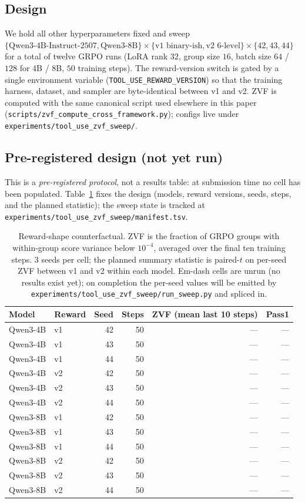 \documentclass{article}
\begin{document}
\subsection{Design}
We hold all other hyperparameters fixed and sweep
\(\{\text{Qwen3-4B-Instruct-2507}, \text{Qwen3-8B}\}
 \times \{\text{v1 binary-ish}, \text{v2 6-level}\}
 \times \{42, 43, 44\}\)
for a total of twelve GRPO runs
(LoRA rank \(32\), group size \(16\), batch size
\(64\) / \(128\) for 4B / 8B, \(50\) training steps).
The reward-version switch is gated by a single environment variable
(\texttt{TOOL\_USE\_REWARD\_VERSION}) so that the training harness, dataset,
and sampler are byte-identical between v1 and v2. ZVF is computed with the
same canonical script used elsewhere in this paper
(\texttt{scripts/zvf\_compute\_cross\_framework.py}); configs live under
\texttt{experiments/tool\_use\_zvf\_sweep/}.

\subsection{Pre-registered design (not yet run)}
This is a \emph{pre-registered protocol}, not a results table: at submission time
no cell has been populated. Table~\ref{tab:zvf_counterfactual} fixes the design
(models, reward versions, seeds, steps, and the planned statistic); the sweep
state is tracked at \texttt{experiments/tool\_use\_zvf\_sweep/manifest.tsv}.

\begin{table}[h]
\centering
\small
\begin{tabular}{llrrrr}
\toprule
Model & Reward & Seed & Steps & ZVF (mean last 10 steps) & Pass\@1 \\
\midrule
Qwen3-4B & v1 & 42 & 50 & --- & --- \\
Qwen3-4B & v1 & 43 & 50 & --- & --- \\
Qwen3-4B & v1 & 44 & 50 & --- & --- \\
Qwen3-4B & v2 & 42 & 50 & --- & --- \\
Qwen3-4B & v2 & 43 & 50 & --- & --- \\
Qwen3-4B & v2 & 44 & 50 & --- & --- \\
\midrule
Qwen3-8B & v1 & 42 & 50 & --- & --- \\
Qwen3-8B & v1 & 43 & 50 & --- & --- \\
Qwen3-8B & v1 & 44 & 50 & --- & --- \\
Qwen3-8B & v2 & 42 & 50 & --- & --- \\
Qwen3-8B & v2 & 43 & 50 & --- & --- \\
Qwen3-8B & v2 & 44 & 50 & --- & --- \\
\bottomrule
\end{tabular}
\caption{Reward-shape counterfactual. ZVF is the fraction of GRPO groups
with within-group score variance below \(10^{-4}\), averaged over the final
ten training steps. \(3\) seeds per cell; the planned summary statistic is
paired-\(t\) on per-seed ZVF between v1 and v2 within each model. Em-dash
cells are unrun (no results exist yet); on completion the per-seed values will be
emitted by \texttt{experiments/tool\_use\_zvf\_sweep/run\_sweep.py} and spliced
in.}
\label{tab:zvf_counterfactual}
\end{table}
\end{document}
